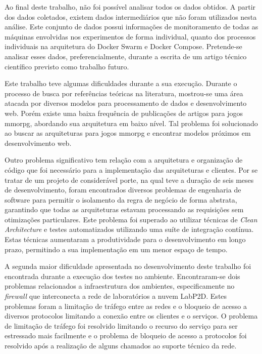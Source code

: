 Ao final deste trabalho, não foi possível analisar todos os dados obtidos.
%
A partir dos dados coletados, existem dados intermediários que não foram utilizados nesta análise.
%
Este conjunto de dados possui informações de monitoramento de todas as máquinas envolvidas nos experimentos de forma individual, quanto dos processos individuais na arquitetura do Docker Swarm e Docker Compose.
%
Pretende-se analisar esses dados, preferencialmente, durante a escrita de um artigo técnico científico previsto como trabalho futuro. 

Este trabalho teve algumas dificuldades durante a sua execução.
%
Durante o processo de busca por referências teóricas na literatura, mostrou-se uma área atacada por diversos modelos para processamento de dados e desenvolvimento web. 
%
Porém existe uma baixa frequência de publicações de artigos para jogos \ac{mmorpg}, abordando sua arquitetura em baixo nível.
%
Tal problema foi solucionado ao buscar as arquiteturas para jogos \ac{mmorpg} e encontrar modelos próximos em desenvolvimento web.

Outro problema significativo tem relação com a arquitetura e organização de código que foi necessário para a implementação das arquiteturas e clientes.
%
Por se tratar de um projeto de considerável porte, na qual teve a duração de seis meses de desenvolvimento, foram encontrados diversos problemas de engenharia de software para permitir o isolamento da regra de negócio de forma abstrata, garantindo que todas as arquiteturas estavam processando as requisições sem otimizações particulares.
%
Este problema foi superado ao utilizar técnicas de \textit{Clean Architecture} e testes automatizados utilizando uma suíte de integração contínua.
%
Estas técnicas aumentaram a produtividade para o desenvolvimento em longo prazo, permitindo a sua implementação em um menor espaço de tempo.
%

A segunda maior dificuldade apresentada no desenvolvimento deste trabalho foi encontrada durante a execução dos testes no ambiente.
%
Encontraram-se dois problemas relacionados a infraestrutura dos ambientes, especificamente no \textit{firewall} que interconecta a rede de laboratórios a nuvem LabP2D.
%
Estes problemas foram a limitação de tráfego entre as redes e o bloqueio de acesso a diversos protocolos limitando a conexão entre os clientes e o serviços.
%
O problema de limitação de tráfego foi resolvido limitando o recurso do serviço para ser estressado mais facilmente e o problema de bloqueio de acesso a protocolos foi resolvido após a realização de alguns chamados ao suporte técnico da rede.
%

